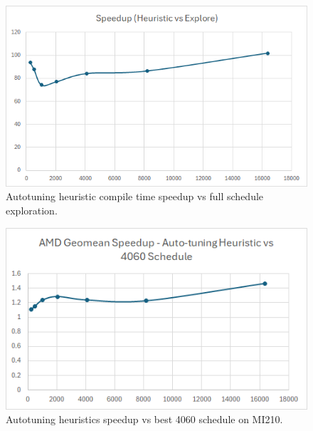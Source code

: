 \begin{figure}[htb]
  \centering
  \includegraphics[width=\linewidth]{figures/HeuristicVsFullExplore_Speedup.png}
  \caption{Autotuning heuristic compile time speedup vs full schedule exploration.}
  \label{Fig:HeuristicVsFullExplore_Speedup}
\end{figure}

\begin{figure}[htb]
  \centering
  \includegraphics[width=\linewidth]{figures/AMD_MI210_ATHeuristicVs4060Sched_speedup.png}
  \caption{Autotuning heuristics speedup vs best 4060 schedule on MI210.}
  \label{Fig:AMD_MI210_ATHeuristicVs4060Sched_speedup}
\end{figure}

